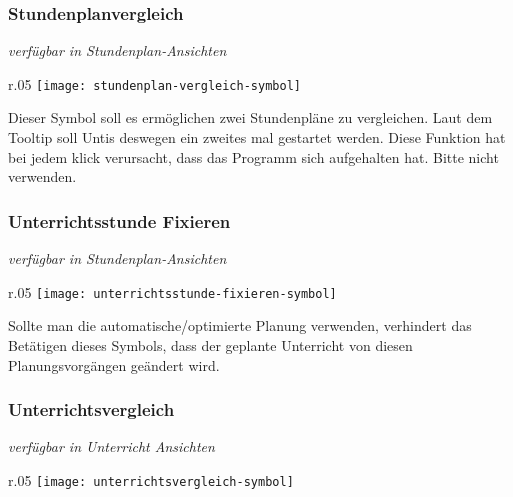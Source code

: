 \subsubsection{Stundenplanvergleich}
{\small\textit{verfügbar in Stundenplan-Ansichten\\}\par}

\begin{wrapfigure}{r}{.05\textwidth}
	\vspace{-50pt}
	\texttt{[image: stundenplan-vergleich-symbol]}
	\vspace{-35pt}
\end{wrapfigure}

\noindent
Dieser Symbol soll es ermöglichen zwei Stundenpläne zu vergleichen. Laut dem Tooltip soll Untis deswegen ein zweites mal gestartet werden. Diese Funktion hat bei jedem klick verursacht, dass das Programm sich aufgehalten hat. Bitte nicht verwenden.\\

\subsubsection{Unterrichtsstunde Fixieren}
{\small\textit{verfügbar in Stundenplan-Ansichten\\}\par}

\begin{wrapfigure}{r}{.05\textwidth}
	\vspace{-50pt}
	\texttt{[image: unterrichtsstunde-fixieren-symbol]}
	\vspace{-35pt}
\end{wrapfigure}

\noindent
Sollte man die automatische/optimierte Planung verwenden, verhindert das Betätigen dieses Symbols, dass der geplante Unterricht von diesen Planungsvorgängen geändert wird.\\

\subsubsection{Unterrichtsvergleich}
{\small\textit{verfügbar in Unterricht Ansichten\\}\par}

\begin{wrapfigure}{r}{.05\textwidth}
	\vspace{-50pt}
	\texttt{[image: unterrichtsvergleich-symbol]}
	\vspace{-35pt}
\end{wrapfigure}

